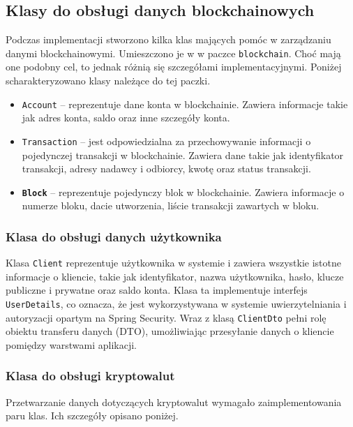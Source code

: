\subsection{Klasy do obsługi danych blockchainowych}
Podczas implementacji stworzono kilka klas mających pomóc w zarządzaniu danymi blockchainowymi. Umieszczono je w w paczce \texttt{blockchain}.
Choć mają one podobny cel, to jednak różnią się szczegółami implementacyjnymi. Poniżej scharakteryzowano klasy należące do tej paczki.
\begin{itemize}
\item \texttt{Account} -- reprezentuje dane konta w blockchainie. Zawiera informacje takie jak adres konta, saldo oraz inne szczegóły konta. 
\item \texttt{Transaction} -- jest odpowiedzialna za przechowywanie informacji o pojedynczej transakcji w blockchainie. Zawiera dane takie jak identyfikator transakcji, adresy nadawcy i odbiorcy, kwotę oraz status transakcji.
\item \textbf{\texttt{Block}} -- reprezentuje pojedynczy blok w blockchainie. Zawiera informacje o numerze bloku, dacie utworzenia, liście transakcji zawartych w bloku. 
\end{itemize}

\subsubsection{Klasa do obsługi danych użytkownika}
Klasa \texttt{Client} reprezentuje użytkownika w systemie i zawiera wszystkie istotne informacje o kliencie, takie jak identyfikator, nazwa użytkownika, hasło, klucze publiczne i prywatne oraz saldo konta. Klasa ta implementuje interfejs \texttt{UserDetails}, co oznacza, że jest wykorzystywana w systemie uwierzytelniania i autoryzacji opartym na Spring Security. Wraz z klasą \texttt{ClientDto} pełni rolę obiektu transferu danych (DTO), umożliwiając przesyłanie danych o kliencie pomiędzy warstwami aplikacji.

\subsubsection{Klasa do obsługi kryptowalut}
Przetwarzanie danych dotyczących kryptowalut wymagało zaimplementowania paru klas. Ich szczegóły opisano poniżej.

